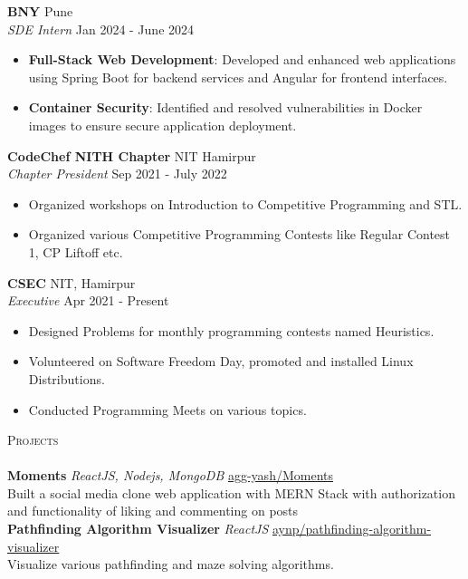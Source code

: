 \documentclass[a4paper]{article}
\newcommand{\lineunder} {
    \vspace*{-8pt} \\
    \hspace*{-18pt} \hrulefill \\
}
\newcommand{\header} [1] {
    {\hspace*{-18pt}\vspace*{6pt} \textsc{#1}}
    \vspace*{-6pt} \lineunder
}
\begin{document}
\textbf{BNY} \hfill Pune\\
\textit{SDE Intern} \hfill Jan 2024 - June 2024\\
\vspace{-1mm}
\begin{itemize} \itemsep 1pt
\item \textbf{Full-Stack Web Development}: Developed and enhanced web applications using Spring Boot for backend services and Angular for frontend interfaces.
\item \textbf{Container Security}: Identified and resolved vulnerabilities in Docker images to ensure secure application deployment.
\end{itemize}


\textbf{CodeChef NITH Chapter} \hfill NIT Hamirpur\\
\textit{Chapter President} \hfill Sep 2021 - July 2022\\
\vspace{-1mm}
\begin{itemize} \itemsep 1pt
	\item Organized workshops on Introduction to Competitive Programming and STL.
	\item Organized various Competitive Programming Contests like Regular Contest 1, CP Liftoff etc.
\end{itemize}
\textbf{CSEC} \hfill NIT, Hamirpur\\
\textit{Executive} \hfill Apr 2021 - Present\\
\vspace{-1mm}
\begin{itemize} \itemsep 1pt
	\item Designed Problems for monthly programming contests named Heuristics.
	\item Volunteered on Software Freedom Day, promoted and installed Linux Distributions.
	\item Conducted Programming Meets on various topics.
\end{itemize}

\header{Projects}
{\textbf{Moments}} {\sl ReactJS, Nodejs, MongoDB} \hfill \href{https://github.com/agg-yash/Moments}{agg-yash/Moments}\\
Built a social media clone web application with MERN Stack with authorization and functionality of liking and commenting on posts\\
\vspace*{2mm}
{\textbf{Pathfinding Algorithm Visualizer}} {\sl ReactJS} \hfill \href{https://github.com/aynp/pathfinding-algorithm-visualizer}{aynp/pathfinding-algorithm-visualizer}\\
Visualize various pathfinding and maze solving algorithms.\\
\vspace*{2mm}
\end{document}
